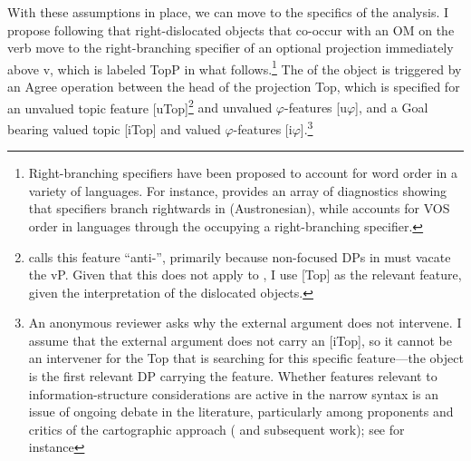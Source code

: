 \documentclass[output=paper,newtxmath,modfonts,nonflat,hidelinks]{langsci/langscibook}
\begin{document}
{With these assumptions in place, we can move to the specifics of the analysis. I propose following \citet{Zeller2015} that right-dislocated objects that co-occur with an OM on the verb move to the right-branching specifier of an optional projection immediately above} v{, which is labeled TopP in what follows}.\footnote{Right-branching specifiers have been proposed to account for word order in a variety of languages. For instance, \citet{Chung1998} provides an array of diagnostics showing that specifiers branch rightwards in  (Austronesian), while \citet{Aissen1992} accounts for VOS order in  languages through the  occupying a right-branching specifier.}{ The  of the object is triggered by an Agree operation between the head of the projection Top, which is specified for an unvalued topic feature [uTop]}\footnote{\citet{Zeller2015} calls this feature “anti-”, primarily because non-focused DPs in  must vacate the vP. Given that this does not apply to , I use [Top] as the relevant feature, given the interpretation of the dislocated objects.} {and unvalued $\varphi $-features [u$\varphi $], and a Goal bearing valued topic [iTop] and valued $\varphi $-features [i$\varphi $]}.\footnote{An anonymous reviewer asks why the external argument does not intervene. I assume that the external argument does not carry an [iTop], so it cannot be an intervener for the Top that is searching for this specific feature—the object is the first relevant DP carrying the feature. Whether features relevant to information-structure considerations are active in the narrow syntax is an issue of ongoing debate in the literature, particularly among proponents and critics of the cartographic approach (\citealt{rizzi1997} and subsequent work); see for instance 
}
\end{document}
